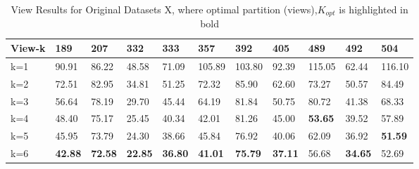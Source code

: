 

\begin{table*}[]
\centering
    \setlength{\tabcolsep}{3pt}
 {\renewcommand{\arraystretch}{1}%
\caption{View Results for Original Datasets X, where optimal partition (views),$K_{opt}$ is highlighted in bold}
\label{tab:my-table}
\begin{tabular}{p{}p{}p{}p{}p{}p{}p{}p{}p{}p{}p{}}
\hline
\textbf{View-k} & \textbf{189} & \textbf{207} & \textbf{332} & \textbf{333} & \textbf{357} & \textbf{392} & \textbf{405} & \textbf{489} & \textbf{492} & \textbf{504} \\ \hline
k=1         & 90.91        & 86.22        & 48.58        & 71.09        & 105.89       & 103.80       & 92.39        & 115.05       & 62.44        & 116.10       \\
k=2         & 72.51        & 82.95        & 34.81        & 51.25        & 72.32        & 85.90        & 62.60        & 73.27        & 50.57        & 84.49        \\
k=3         & 56.64        & 78.19        & 29.70        & 45.44        & 64.19        & 81.84        & 50.75        & 80.72        & 41.38        & 68.33        \\
k=4         & 48.40        & 75.17        & 25.45        & 40.34        & 42.01        & 81.26        & 45.00        & \textbf{53.65}        & 39.52        & 57.89        \\
k=5         & 45.95        & 73.79        & 24.30        & 38.66        & 45.84        & 76.92        & 40.06        & 62.09        & 36.92        & \textbf{51.59}        \\
k=6         & \textbf{42.88}        & \textbf{72.58}        & \textbf{22.85}        & \textbf{36.80}        & \textbf{41.01}        & \textbf{75.79}        & \textbf{37.11}        & 56.68        & \textbf{34.65 }       & 52.69        \\ \hline
\end{tabular}%
}
\end{table*}
